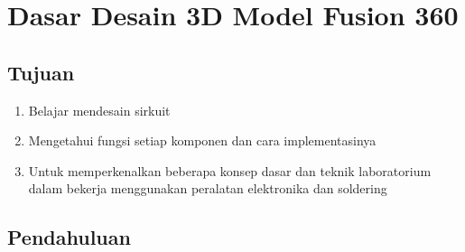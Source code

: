 \chapter{Dasar Desain 3D Model Fusion 360}

\section{Tujuan}\begin{enumerate}
    \item Belajar mendesain sirkuit
    \item Mengetahui fungsi setiap komponen dan cara implementasinya
    \item Untuk memperkenalkan beberapa konsep dasar dan teknik laboratorium dalam bekerja menggunakan peralatan elektronika dan soldering
\end{enumerate}


\section{Pendahuluan}